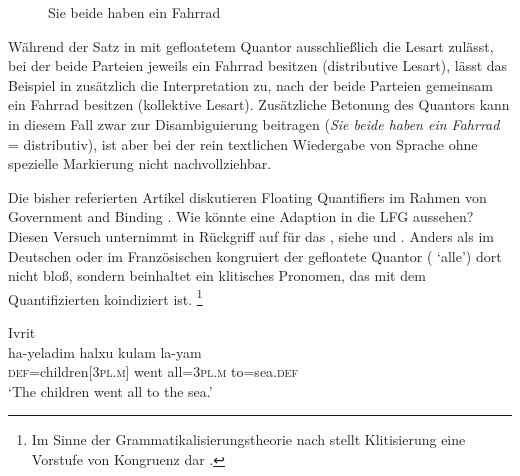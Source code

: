 \begin{figure}
\caption{Sie beide haben ein Fahrrad}
\label{fig:siebeidefhrd_2}
\end{figure}

Während der Satz in  mit gefloatetem Quantor
ausschließlich die Lesart zulässt, bei der beide Parteien jeweils ein Fahrrad
besitzen (distributive Lesart), lässt das Beispiel in 
zusätzlich die Interpretation zu, nach der beide Parteien gemeinsam ein Fahrrad
besitzen (kollektive Lesart). Zusätzliche Betonung des Quantors kann in diesem
Fall zwar zur Disambiguierung beitragen (\emph{Sie \emph{beide} haben ein
Fahrrad} = distributiv), ist aber bei der rein textlichen Wiedergabe von Sprache
ohne spezielle Markierung nicht nachvollziehbar.

\label{phsec:hebrqf}
Die bisher referierten Artikel diskutieren Floating Quantifiers im Rahmen von
Government and Binding \autocite{chomsky1981}. Wie könnte eine Adaption in die
LFG aussehen? Diesen Versuch unternimmt \citet{spector2009} in Rückgriff auf
\citet{shlonsky1991} für das , siehe  und
. Anders als im Deutschen oder im
Französischen kongruiert der gefloatete Quantor (
`alle') dort nicht bloß, sondern beinhaltet ein klitisches Pronomen, das mit
dem Quantifizierten koindiziert ist.%
%
	\footnote{Im Sinne der Grammatikalisierungs\-theorie nach
		\citet{lehmann2015} stellt Klitisierung eine Vorstufe von Kongruenz dar
		\autocite[vgl.][44]{lehmann2015}.%
	}

\begin{exe}
\ex \label{ex:hebrqf}
	\langinfo%
		{Ivrit}
		{}
		{\cite[nach][522, 537]{spector2009}}\\
	\gll ha-yeladim halxu kulam la-yam \\
		\textsc{def}=children[\textsc{3pl.m}] went all=\textsc{3pl.m}
			to=sea.\textsc{def} \\
	\trans `The children went all to the sea.'
\end{exe}

